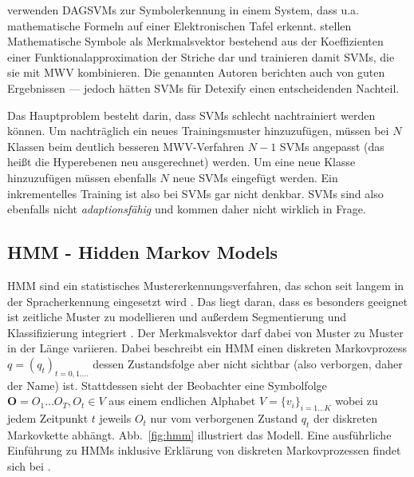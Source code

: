 \citet{Tapia:2003p11202,Tapia:2005p11236} verwenden \ac{DAGSVM}s \cite{Platt:2000p11488} zur Symbolerkennung in einem System, dass u.a. mathematische Formeln auf einer Elektronischen Tafel erkennt.
\citet{Golubitsky:2009p2456,Keshari:2008p528,Golubitsky:2009p2321} stellen Mathematische Symbole als Merkmalsvektor bestehend aus der Koeffizienten einer Funktionalapproximation der Striche dar und trainieren damit \ac{SVM}s, die sie mit \ac{MWV} kombinieren. Die genannten Autoren berichten auch von guten Ergebnissen — jedoch hätten \ac{SVM}s für Detexify einen entscheidenden Nachteil.

Das Hauptproblem besteht darin, dass SVMs schlecht nachtrainiert werden können. Um nachträglich ein neues Trainingsmuster hinzuzufügen, müssen bei $N$ Klassen beim deutlich besseren MWV-Verfahren \cite{Duan:2005p11426} $N-1$ SVMs angepasst (das heißt die Hyperebenen neu ausgerechnet) werden. Um eine neue Klasse hinzuzufügen müssen ebenfalls $N$ neue SVMs eingefügt werden. Ein inkrementelles Training ist also bei SVMs gar nicht denkbar. SVMs sind also ebenfalls nicht \emph{adaptionsfähig} und kommen daher nicht wirklich in Frage.

\subsection[HMM]{HMM - Hidden Markov Models} \label{sub:hmm}

\ac{HMM} sind ein statistisches Mustererkennungsverfahren, das schon seit langem in der Spracherkennung eingesetzt wird \cite{Rabiner:1989p11574}. Das liegt daran, dass es besonders geeignet ist zeitliche Muster zu modellieren und außerdem Segmentierung und Klassifizierung integriert \cite{Kosmala:1998p11691}. Der Merkmalsvektor darf dabei von Muster zu Muster in der Länge variieren.
Dabei beschreibt ein HMM einen diskreten Markovprozess $q=(q_t)_{t=0,1.\dots}$ dessen Zustandsfolge aber nicht sichtbar (also verborgen, daher der Name) ist. Stattdessen sieht der Beobachter eine Symbolfolge $\mathbf{O}=O_1\dots O_T, O_t\in V$ aus einem endlichen Alphabet $V=\{v_i\}_{i=1\dots K}$ wobei zu jedem Zeitpunkt $t$ jeweils $O_t$ nur vom verborgenen Zustand $q_t$ der diskreten Markovkette abhängt. Abb.~\ref{fig:hmm} illustriert das Modell. Eine ausführliche Einführung zu HMMs inklusive Erklärung von diskreten Markovprozessen findet sich bei \citet{Rabiner:1989p11574}.

